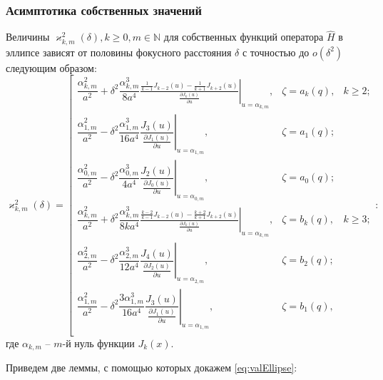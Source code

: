 \subsubsection{Асимптотика собственных значений}\label{sec:ch1/sec2/sub2/sub2}
\begin{theorem}
Величины $\varkappa^2_{k,m}(\delta), k \geq 0, m \in \mathbb{N}$ для собственных функций оператора $\hat{H}$ в эллипсе зависят от половины фокусного расстояния $\delta$ с точностью до $o(\delta^2)$ следующим образом:
{
\begin{equation}
\varkappa^2_{k,m}(\delta) = \left[
\begin{array}{ccc}
\dfrac{\alpha_{k, m}^2}{a^2} +  \delta^2 
\dfrac{\alpha_{k, m}^3}{8 a^4}
\left. \frac{\frac{1}{k-1} J_{k-2}(u) - \frac{1}{k+1}J_{k+2}(u)}{\frac{\partial J_{k} (u)}{\partial u}}\right|_{u=\alpha_{k, m}} , 
 & \zeta = a_k(q), & k \geq 2; \\
\dfrac{\alpha_{1, m}^2}{a^2} -  \delta^2 \dfrac{\alpha_{1, m}^3}{16 a^4}\left.\dfrac{J_{3}(u)}{\frac{\partial J_{1} (u)}{\partial u}}\right|_{u=\alpha_{1, m}}, & \zeta = a_1(q); \\
\dfrac{\alpha_{0, m}^2}{a^2} -  \delta^2 \dfrac{\alpha_{0, m}^3}{4 a^4}\left.\dfrac{J_{2}(u)}{\frac{\partial J_{0} (u)}{\partial u}}\right|_{u=\alpha_{0, m}},
 & \zeta = a_0(q); \\
\dfrac{\alpha_{k, m}^2}{a^2} +  \delta^2 
\dfrac{\alpha_{k, m}^3}{8 k a^4}
\left.\frac{\frac{k-2}{k-1} J_{k-2}(u) - \frac{k+2}{k+1} J_{k+2}(u)}{\frac{\partial J_{k} (u)}{\partial u}}\right|_{u=\alpha_{k, m}} , & \zeta = b_k(q), & k \geq 3; \\
\dfrac{\alpha_{2, m}^2}{a^2} -  \delta^2 \dfrac{\alpha_{2, m}^3}{12 a^4}\left.\dfrac{J_{4}(u)}{\frac{\partial J_{2} (u)}{\partial u}}\right|_{u=\alpha_{2, m}},
 & \zeta = b_2(q); \\
\dfrac{\alpha_{1, m}^2}{a^2} -  \delta^2 \dfrac{3\alpha_{1, m}^3}{16 a^4}\left.\dfrac{ J_{3}(u)}{\frac{\partial J_{1} (u)}{\partial u}}\right|_{u=\alpha_{1, m}},
 & \zeta = b_1(q), \\
\end{array}
\right.
\label{eq:valEllipse}:
\end{equation}
}
где $\alpha_{k, m}$ -- $m$-й нуль функции $J_k(x)$. 
\label{th:stat4}
\end{theorem}

Приведем две леммы, с помощью которых докажем \ref{eq:valEllipse}:

